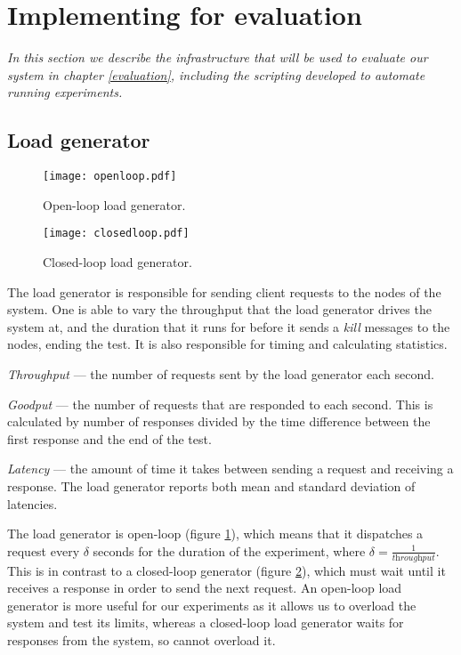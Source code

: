 \section{Implementing for evaluation} \label{benchcode}

\textit{In this section we describe the infrastructure that will be used to evaluate our system in chapter \ref{evaluation}, including the scripting developed to automate running experiments.}

\subsection{Load generator} \label{loadgenerator}

\begin{figure}[h]
\centering
\texttt{[image: openloop.pdf]}
\caption{Open-loop load generator.}
\label{openloop}
\end{figure}

\begin{figure}[h]
\centering
\texttt{[image: closedloop.pdf]}
\caption{Closed-loop load generator.}
\label{closedloop}
\end{figure}

The load generator is responsible for sending client requests to the nodes of the system. One is able to vary the throughput that the load generator drives the system at, and the duration that it runs for before it sends a \textit{kill} messages to the nodes, ending the test. It is also responsible for timing and calculating statistics.

\begin{description}
	\item \textit{Throughput} --- the number of requests sent by the load generator each second.
	\item \textit{Goodput} --- the number of requests that are responded to each second. This is calculated by number of responses divided by the time difference between the first response and the end of the test.
	\item \textit{Latency} --- the amount of time it takes between sending a request and receiving a response. The load generator reports both mean and standard deviation of latencies.
\end{description}

The load generator is open-loop (figure \ref{openloop}), which means that it dispatches a request every $\delta$ seconds for the duration of the experiment, where $\delta = \frac{1}{\textit{throughput}}$. This is in contrast to a closed-loop generator (figure \ref{closedloop}), which must wait until it receives a response in order to send the next request. An open-loop load generator is more useful for our experiments as it allows us to overload the system and test its limits, whereas a closed-loop load generator waits for responses from the system, so cannot overload it.

